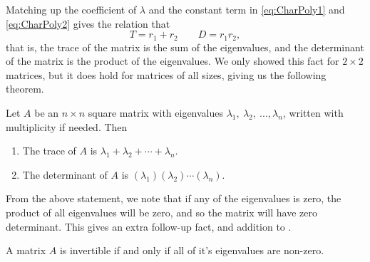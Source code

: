 \documentclass{ximera}
\begin{document}
Matching up the coefficient of $\lambda$ and the constant term in \eqref{eq:CharPoly1} and \eqref{eq:CharPoly2} gives the relation that
\begin{equation*}
    T = r_1 + r_2 \qquad D = r_1r_2,
\end{equation*}
that is, the trace of the matrix is the sum of the eigenvalues, and the determinant of the matrix is the product of the eigenvalues. We only showed this fact for $2 \times 2$ matrices, but it does hold for matrices of all sizes, giving us the following theorem.

\begin{theorem}
    Let $A$ be an $n \times n$ square matrix with eigenvalues $\lambda_1,\ \lambda_2,\ ..., \lambda_n$, written with multiplicity if needed. Then
    \begin{enumerate}
        \item The trace of $A$ is $\lambda_1 + \lambda_2 + \cdots + \lambda_n$.
        \item The determinant of $A$ is $(\lambda_1)(\lambda_2)\cdots(\lambda_n)$.
    \end{enumerate}
\end{theorem}

From the above statement, we note that if any of the eigenvalues is zero, the product of all eigenvalues will be zero, and so the matrix will have zero determinant. This gives an extra follow-up fact, and addition to .

\begin{theorem}
    A matrix $A$ is invertible if and only if all of it's eigenvalues are non-zero.
\end{theorem}
\end{document}
